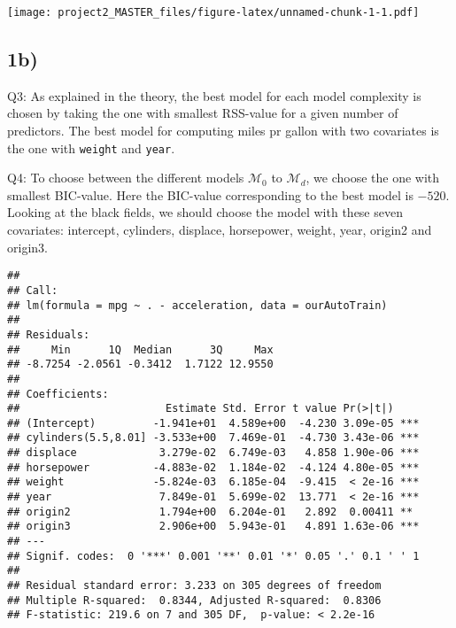 \documentclass[]{article}
\newenvironment{Shaded}{\begin{snugshade}}{\end{snugshade}}
\newcommand{\KeywordTok}[1]{\textcolor[rgb]{0.13,0.29,0.53}{\textbf{#1}}}
\newcommand{\DataTypeTok}[1]{\textcolor[rgb]{0.13,0.29,0.53}{#1}}
\newcommand{\DecValTok}[1]{\textcolor[rgb]{0.00,0.00,0.81}{#1}}
\newcommand{\CommentTok}[1]{\textcolor[rgb]{0.56,0.35,0.01}{\textit{#1}}}
\newcommand{\OperatorTok}[1]{\textcolor[rgb]{0.81,0.36,0.00}{\textbf{#1}}}
\newcommand{\NormalTok}[1]{#1}
\begin{document}
\texttt{[image: project2\_MASTER\_files/figure-latex/unnamed-chunk-1-1.pdf]}

\subsection{1b)}\label{b}

Q3: As explained in the theory, the best model for each model complexity
is chosen by taking the one with smallest RSS-value for a given number
of predictors. The best model for computing miles pr gallon with two
covariates is the one with \texttt{weight} and \texttt{year}.

Q4: To choose between the different models \(\mathcal{M}_0\) to
\(\mathcal{M}_d\), we choose the one with smallest BIC-value. Here the
BIC-value corresponding to the best model is \(-520\). Looking at the
black fields, we should choose the model with these seven covariates:
intercept, cylinders, displace, horsepower, weight, year, origin2 and
origin3.

\begin{Shaded}
\end{Shaded}

\begin{verbatim}
## 
## Call:
## lm(formula = mpg ~ . - acceleration, data = ourAutoTrain)
## 
## Residuals:
##     Min      1Q  Median      3Q     Max 
## -8.7254 -2.0561 -0.3412  1.7122 12.9550 
## 
## Coefficients:
##                       Estimate Std. Error t value Pr(>|t|)    
## (Intercept)         -1.941e+01  4.589e+00  -4.230 3.09e-05 ***
## cylinders(5.5,8.01] -3.533e+00  7.469e-01  -4.730 3.43e-06 ***
## displace             3.279e-02  6.749e-03   4.858 1.90e-06 ***
## horsepower          -4.883e-02  1.184e-02  -4.124 4.80e-05 ***
## weight              -5.824e-03  6.185e-04  -9.415  < 2e-16 ***
## year                 7.849e-01  5.699e-02  13.771  < 2e-16 ***
## origin2              1.794e+00  6.204e-01   2.892  0.00411 ** 
## origin3              2.906e+00  5.943e-01   4.891 1.63e-06 ***
## ---
## Signif. codes:  0 '***' 0.001 '**' 0.01 '*' 0.05 '.' 0.1 ' ' 1
## 
## Residual standard error: 3.233 on 305 degrees of freedom
## Multiple R-squared:  0.8344, Adjusted R-squared:  0.8306 
## F-statistic: 219.6 on 7 and 305 DF,  p-value: < 2.2e-16
\end{verbatim}
\end{document}
